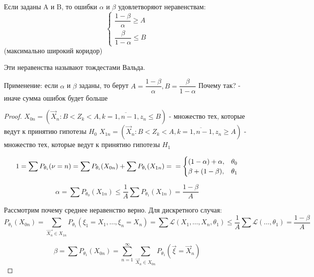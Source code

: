 \begin{theorem}[Вальда]
  Если заданы A и B, то ошибки $\alpha$ и $\beta$ удовлетворяют неравенствам:
  \begin{equation*}
    \begin{cases}
      \dfrac{1 - \beta}{\alpha} \geqslant A \\
      \dfrac{\beta}{1 - \alpha} \leqslant B
    \end{cases}
  \end{equation*}
  (максимально широкий коридор)

  Эти неравенства называют тождестами Вальда.

\end{theorem}

Применение: если $\alpha$ и $\beta$ заданы, то берут $A = \dfrac{1-\beta}{\alpha}, B = \dfrac{\beta}{1 - \alpha}$
Почему так? - иначе сумма ошибок будет больше

\begin{proof}
  $X_{0n} = \left( \vec{X}_n : B < Z_k < A, k = \overline{1, n-1}, z_n \leqslant B \right)$ - множество тех, которые ведут к принятию гипотезы $H_0$
  $X_{1n} = \left( \vec{X}_n : B < Z_k < A, k = \overline{1, n-1}, z_n \geqslant A \right)$ - множество тех, которые ведут к принятию гипотезы $H_1$

  \begin{equation*}
    1 = \sum  P_{\theta_i} (\nu = n) = \sum P_{\theta_i} (X_{0n}) + \sum P_{\theta_i} (X_{1n}) = \\
    = \begin{cases}
      (1 - \alpha) + \alpha, &\theta_0 \\
      \beta + (1 - \beta), &\theta_1
    \end{cases} 
  \end{equation*}

  \[
    \alpha = \sum P_{\theta_0} (X_{1n}) \leqslant \dfrac{1}{A} \sum P_{\theta_1} (X_{1n}) = \dfrac{1 - \beta}{A}
  \]
  
  Рассмотрим почему среднее неравенство верно. Для дискретного случая:
  \[
    P_{\theta_1} (X_{0n}) = \sum_{\vec{X_n} \in X_{1n}} P_{\theta_1}(\xi_1 = X_1, \dots, \xi_n = X_n)= \sum \mathcal{L} (X_1, \dots, X_n, \theta_1) \leqslant \dfrac{1}{A} \sum \mathcal{L} (\dots, \theta_1) = \dfrac{1 - \beta}{A}
  \]

  \[
    \beta = \sum P_{\theta_1} (X_{0n}) = \sum_{n=1}^\infty \sum_{\vec{X}_n \in X_{0n}} P_{\theta_1} (\vec{\xi} = \vec{X}_n)
  \]
\end{proof}
